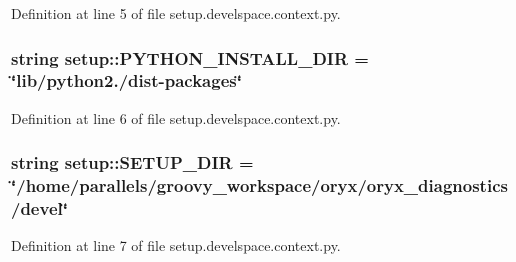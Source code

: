 \-Definition at line 5 of file setup.\-develspace.\-context.\-py.

\subsubsection[{\-P\-Y\-T\-H\-O\-N\-\_\-\-I\-N\-S\-T\-A\-L\-L\-\_\-\-D\-I\-R}]{\setlength{\rightskip}{0pt plus 5cm}string {\bf setup\-::\-P\-Y\-T\-H\-O\-N\-\_\-\-I\-N\-S\-T\-A\-L\-L\-\_\-\-D\-I\-R} = \char`\"{}lib/python2./dist-\/packages\char`\"{}}\label{namespacesetup_aeca0160af888aac6e3bd8a065852b61f}


\-Definition at line 6 of file setup.\-develspace.\-context.\-py.

\subsubsection[{\-S\-E\-T\-U\-P\-\_\-\-D\-I\-R}]{\setlength{\rightskip}{0pt plus 5cm}string {\bf setup\-::\-S\-E\-T\-U\-P\-\_\-\-D\-I\-R} = \char`\"{}/home/parallels/groovy\-\_\-workspace/oryx/oryx\-\_\-diagnostics/devel\char`\"{}}\label{namespacesetup_a98792229e61a663fcdf89c12b1f1dbc2}


\-Definition at line 7 of file setup.\-develspace.\-context.\-py.

